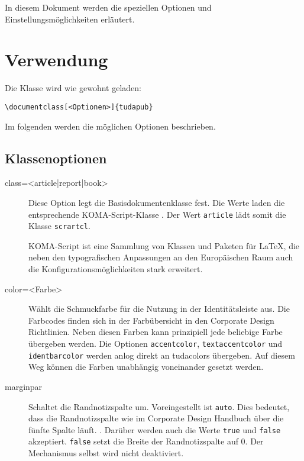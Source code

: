 \documentclass[
	german,
	accentcolor=9c,%
	]{tudapub}
\let\code\texttt
\let\pck\textsf
\begin{document}
In diesem Dokument werden die speziellen Optionen und Einstellungsmöglichkeiten erläutert.

\section{Verwendung}
Die Klasse wird wie gewohnt geladen:
\begin{verbatim}
\documentclass[<Optionen>]{tudapub}
\end{verbatim}
Im folgenden werden die möglichen Optionen beschrieben.

\subsection{Klassenoptionen}

\begin{description}
	\item[class=<article|report|book>] Diese Option legt die Basisdokumentenklasse fest. Die Werte laden die entsprechende KOMA-Script-Klasse \cite{scrguide}. Der Wert \code{article} lädt somit die Klasse \code{scrartcl}.

	KOMA-Script ist eine Sammlung von Klassen und Paketen für \LaTeX, die neben den typografischen Anpassungen an den Europäischen Raum auch die Konfigurationsmöglichkeiten stark erweitert.
	\item[color=<Farbe>] Wählt die Schmuckfarbe für die Nutzung in der Identitätsleiste aus. Die Farbcodes finden sich in der Farbübersicht in den Corporate Design Richtlinien. Neben diesen Farben kann prinzipiell jede beliebige Farbe übergeben werden. Die Optionen \code{accentcolor}, \code{textaccentcolor} und \code{identbarcolor} werden anlog direkt an \pck{tudacolors} übergeben. Auf diesem Weg können die Farben unabhängig voneinander gesetzt werden.
	\item[marginpar] Schaltet die Randnotizspalte um. Voreingestellt ist \code{auto}. Dies bedeutet, dass die Randnotizspalte wie im Corporate Design Handbuch \cite{TUDaGuideline} über die fünfte Spalte läuft.  .
	Darüber werden auch die Werte \code{true} und \code{false} akzeptiert. \code{false} setzt die Breite der Randnotizspalte auf 0. Der Mechanismus selbst wird nicht deaktiviert.


\end{description}
\end{document}
